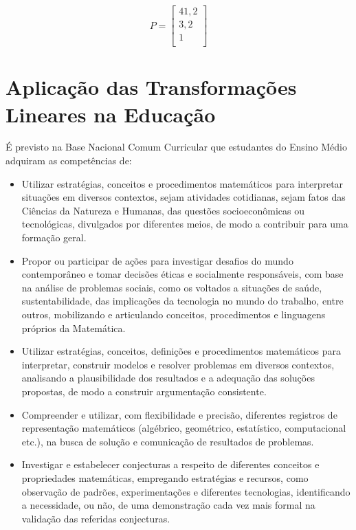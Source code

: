 \[
P = \begin{bmatrix}
	41,2\\
	3,2\\
	1\\
\end{bmatrix}
\]

\section{Aplicação das Transformações Lineares na Educação}
É previsto na Base Nacional Comum Curricular \cite{brasil_bncc2018} que estudantes do Ensino Médio adquiram as competências de:

\begin{itemize}
	\item Utilizar estratégias, conceitos e procedimentos matemáticos para interpretar situações em diversos contextos, sejam atividades cotidianas, sejam fatos das Ciências da Natureza e Humanas, das questões socioeconômicas ou tecnológicas, divulgados por diferentes meios, de modo a contribuir para uma formação geral. 
	\item Propor ou participar de ações para investigar desafios do mundo contemporâneo e tomar decisões éticas e socialmente responsáveis, com base na análise de problemas sociais, como os voltados a situações de saúde, sustentabilidade, das implicações da tecnologia no mundo do trabalho, entre outros, mobilizando e articulando conceitos, procedimentos e linguagens próprios da Matemática. 
	\item Utilizar estratégias, conceitos, definições e procedimentos matemáticos para interpretar, construir modelos e resolver problemas em diversos contextos, analisando a plausibilidade dos resultados e a adequação das soluções propostas, de modo a construir argumentação consistente. 
	\item Compreender e utilizar, com flexibilidade e precisão, diferentes registros de representação matemáticos (algébrico, geométrico, estatístico, computacional etc.), na busca de solução e comunicação de resultados de problemas. 
	\item Investigar e estabelecer conjecturas a respeito de diferentes conceitos e propriedades matemáticas, empregando estratégias e recursos, como observação de padrões, experimentações e diferentes tecnologias, identificando a necessidade, ou não, de uma demonstração cada vez mais formal na validação das referidas conjecturas.
\end{itemize}

